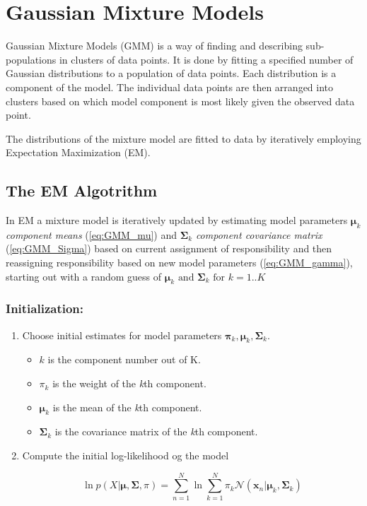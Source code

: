 \section*{Gaussian Mixture Models}
Gaussian Mixture Models (GMM) is a way of finding and describing sub-populations in clusters of data points.
It is done by fitting a specified number of Gaussian distributions to a population of data points.
Each distribution is a component of the model. 
The individual data points are then arranged into clusters based on which model component is most likely given the observed data point.

The distributions of the mixture model are fitted to data by iteratively employing Expectation Maximization (EM).

\subsection*{The EM Algotrithm}
In EM a mixture model is iteratively updated by estimating model parameters $\bm{\mu}_k $ \emph{component means} (\ref{eq:GMM_mu}) and $ \bm{\Sigma}_k $ \emph{component covariance matrix} (\ref{eq:GMM_Sigma}) based on current assignment of responsibility and then reassigning responsibility based on new model parameters (\ref{eq:GMM_gamma}), starting out with a random guess of $\bm{\mu}_k \text{ and } \bm{\Sigma}_k \text{ for } k=1..K$ 


\subsubsection*{Initialization:}
\begin{enumerate}
\item
Choose initial estimates for model parameters $ \mathbf{\pi}_{k}, \mathbf{\mu}_{k}, \mathbf{\Sigma}_{k} $.

\begin{itemize}

	\item
	$ k $ is the component number out of K.

	\item
	$ \pi_{k} $  is the weight of the \textit{k}th component.

	\item
	$ \mathbf{\mu}_{k}$ is the mean of the \textit{k}th component.

	\item
	$ \mathbf{\Sigma}_{k} $ is the covariance matrix of the \textit{k}th component.

	\end{itemize}


\item
Compute the initial log-likelihood og the model

\begin{equation} \label{eq:loglikeGMM}
\ln p\left(X | \mathbf{\mu}, \mathbf{\Sigma}, \pi\right) = 
\sum_{n=1}^{N} \ln \sum_{k=1}^{N} \pi_{k}\mathcal{N}(\mathbf{x}_{n}|\mathbf{\mu}_{k},\mathbf{\Sigma}_{k})
\end{equation}

\end{enumerate}

